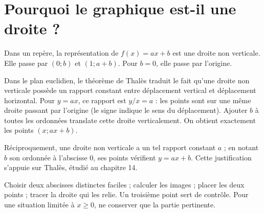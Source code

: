 \documentclass[../cours_3e.tex]{subfiles}
\begin{document}
\section{Pourquoi le graphique est-il une droite ?}
\begin{propriete}
Dans un repère, la représentation de $f(x)=ax+b$ est une droite non verticale. Elle passe par $(0;b)$ et $(1;a+b)$. Pour $b=0$, elle passe par l'origine.
\end{propriete}
\begin{demonstration}
Dans le plan euclidien, le théorème de Thalès traduit le fait qu'une droite non verticale possède un rapport constant entre déplacement vertical et déplacement horizontal. Pour $y=ax$, ce rapport est $y/x=a$ : les points sont sur une même droite passant par l'origine (le signe indique le sens du déplacement). Ajouter $b$ à toutes les ordonnées translate cette droite verticalement. On obtient exactement les points $(x;ax+b)$.

Réciproquement, une droite non verticale a un tel rapport constant $a$ ; en notant $b$ son ordonnée à l'abscisse $0$, ses points vérifient $y=ax+b$. Cette justification s'appuie sur Thalès, étudié au chapitre 14.
\end{demonstration}
\begin{center}
\end{center}
\begin{methode}[Tracer]
Choisir deux abscisses distinctes faciles ; calculer les images ; placer les deux points ; tracer la droite qui les relie. Un troisième point sert de contrôle. Pour une situation limitée à $x\geq0$, ne conserver que la partie pertinente.
\end{methode}
\end{document}
